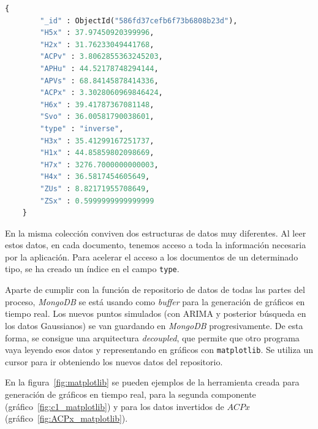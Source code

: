 \documentclass[11pt,spanish,listoffigures,listoftables]{tfgetsinf}
\begin{document}
        \begin{lstlisting}[language=Python, captionpos=b, caption=Documento de tipo {\tt inverse}., label={lst:generated_inverse}]
    {
        "_id" : ObjectId("586fd37cefb6f73b6808b23d"),
        "H5x" : 37.97450920399996,
        "H2x" : 31.76233049441768,
        "ACPv" : 3.8062855363245203,
        "APHu" : 44.52178748294144,
        "APVs" : 68.84145878414336,
        "ACPx" : 3.3028060969846424,
        "H6x" : 39.41787367081148,
        "Svo" : 36.00581790038601,
        "type" : "inverse",
        "H3x" : 35.41299167251737,
        "H1x" : 44.85859802098669,
        "H7x" : 3276.7000000000003,
        "H4x" : 36.5817454605649,
        "ZUs" : 8.82171955708649,
        "ZSx" : 0.5999999999999999
    }
        \end{lstlisting}
        
        En la misma colección conviven dos estructuras de datos muy diferentes. Al leer estos datos, en cada documento, tenemos acceso a toda la información necesaria por la aplicación. Para acelerar el acceso a los documentos de un determinado tipo, se ha creado un índice en el campo {\tt type}.
        
        Aparte de cumplir con la función de repositorio de datos de todas las partes del proceso, {\em MongoDB} se está usando como {\em buffer} para la generación de gráficos en tiempo real. Los nuevos puntos simulados (con ARIMA y posterior búsqueda en los datos Gaussianos) se van guardando en {\em MongoDB} progresivamente. De esta forma, se consigue una arquitectura {\em decoupled}, que permite que otro programa vaya leyendo esos datos y representando en gráficos con {\tt matplotlib}. Se utiliza un cursor para ir obteniendo los nuevos datos del repositorio.
        
        En la figura~\ref{fig:matplotlib} se pueden ejemplos de la herramienta creada para generación de gráficos en tiempo real, para la segunda componente (gráfico~\ref{fig:c1_matplotlib}) y para los datos invertidos de \(ACPx\) (gráfico~\ref{fig:ACPx_matplotlib}). 
        
\end{document}

